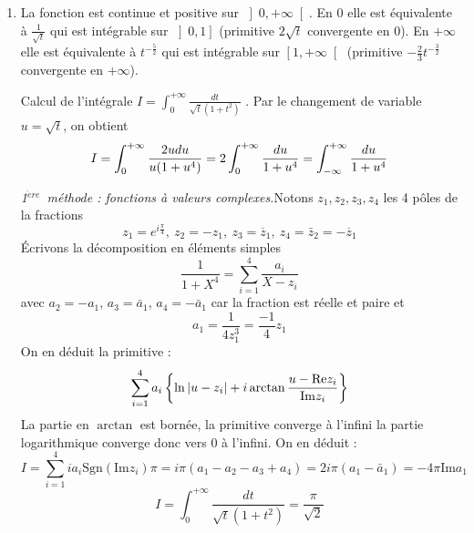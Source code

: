 \begin{enumerate}
\item  La fonction est continue et positive sur $\left] 0,+\infty \right[ .$
En $0$ elle est {\'e}quivalente {\`a} $\frac{1}{\sqrt{t}}$ qui est
int{\'e}grable sur $\left] 0,1\right] $ (primitive $2\sqrt{t}$
convergente en 0). En $+\infty $ elle est {\'e}quivalente {\`a}
$t^{-\frac{5}{2}}$ qui
est int{\'e}grable sur $\left[ 1,+\infty \right[ $ (primitive $-\frac{2}{3}%
t^{-\frac{3}{2}}$ convergente en $+\infty $).

Calcul de l'int{\'e}grale $I=\int_{0}^{+\infty }\frac{dt}{\sqrt{t}(1+t^{2})}$%
. Par le changement de variable $u=\sqrt{t}$, on obtient
\[
I=\int_{0}^{+\infty }\frac{2udu}{u(1+u^{4})}=2\int_{0}^{+\infty }\frac{du}{%
1+u^{4}}=\int_{-\infty }^{+\infty }\frac{du}{1+u^{4}}
\]

\emph{1}$^{\grave{e}re}$\emph{\ m{\'e}thode : fonctions {\`a} valeurs
complexes.}\newline Notons $z_{1},z_{2},z_{3},z_{4}$ les 4 p{\^o}les
de la fractions
\[
z_{1}=e^{i\frac{\pi }{4}},\ z_{2}=-z_{1},\ z_{3}=\overline{z}_{1},\ z_{4}=%
\bar{z}_{2}=-\overline{z}_{1}
\]
{\'E}crivons la d{\'e}composition en {\'e}l{\'e}ments simples
\[
\frac{1}{1+X^{4}}=\sum_{i=1}^{4}\frac{a_{i}}{X-z_{i}}
\]
avec $a_{2}=-a_{1}$, $a_{3}=\bar{a}_{1}$, $a_{4}=-\bar{a}_{1}$ car
la fraction est r{\'e}elle et paire et
\[
a_{1}=\frac{1}{4z_{1}^{3}}=\frac{-1}{4}z_{1}
\]
On en d{\'e}duit la primitive :
\[
\sum_{i=1}^{4}a_{i}\left\{ \ln \left| u-z_{i}\right| +i\arctan \frac{u-\mathrm{%
Re}z_{i}}{\mathrm{Im}z_{i}}\right\}
\]
La partie en $\arctan $ est born{\'e}e, la primitive converge {\`a}
l'infini la partie logarithmique converge donc vers $0$ {\`a}
l'infini. On en d{\'e}duit :
\[
I=\sum_{i=1}^{4}ia_{i}\text{Sgn}(\mathrm{Im}z_{i})\pi =i\pi
(a_{1}-a_{2}-a_{3}+a_{4})=2i\pi (a_{1}-\bar{a}_{1})=-4\pi
\mathrm{Im}a_{1}
\]
\[
I=\int_{0}^{+\infty }\frac{dt}{\sqrt{t}(1+t^{2})}=\frac{\pi
}{\sqrt{2}}
\]


\end{enumerate}
